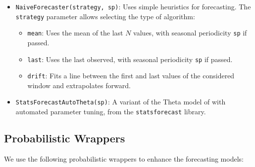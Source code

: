\begin{itemize}
    \item \texttt{NaiveForecaster(strategy, sp)}: Uses simple heuristics for forecasting. The \texttt{strategy} parameter allows selecting the type of algorithm:
    \begin{itemize}
        \item \texttt{mean}: Uses the mean of the last \(N\) values, with seasonal periodicity \texttt{sp} if passed.
        \item \texttt{last}: Uses the last observed, with seasonal periodicity \texttt{sp} if passed.
        \item \texttt{drift}: Fits a line between the first and last values of the considered window and extrapolates forward.
    \end{itemize}

    \item \texttt{StatsForecastAutoTheta(sp)}: A variant of the Theta model of \cite{Assimakopoulos2000} with automated parameter tuning, from the \texttt{statsforecast} library.
    
\end{itemize}

\subsection{Probabilistic Wrappers}
We use the following probabilistic wrappers to enhance the forecasting models:

